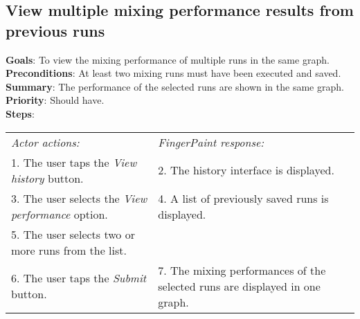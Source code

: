 \begin{appendices}
    \section{View multiple mixing performance results from previous runs}
  \label{viewmulruns}
  \textbf{Goals}: To view the mixing performance of multiple runs in the same graph.\\
  \textbf{Preconditions}: At least two mixing runs must have been executed and saved.\\
  \textbf{Summary}: The performance of the selected runs are shown in the same graph.\\
  \textbf{Priority}: Should have.\\
  \textbf{Steps}: \\
  \begin{tabular}{ p{} p{} }
  	\emph{Actor actions:} & \emph{FingerPaint response:} \\
	   1. The user taps the \emph{View history} button. & 2. The history interface is displayed. \\
	 3. The user selects the \emph{View performance} option. & 4. A list of previously saved runs is displayed.\\
	 5. The user selects two or more runs from the list. & \\
	 6. The user taps the \emph{Submit} button. & 7. The mixing performances of the selected runs are displayed in one graph.\\
  \end{tabular}



\end{appendices}
